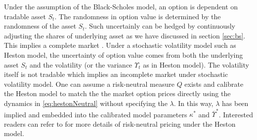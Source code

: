 \documentclass[letterpaper,12pt,titlepage,oneside,final]{book}
\numberwithin{equation}{section}
\theoremstyle{definition}
\begin{document}
Under the assumption of the Black-Scholes model, an option is dependent on tradable asset $S_t$. The randomness in option value is determined by the randomness of the asset $S_t$. Such uncertainly can be hedged by continuously adjusting the shares of underlying asset as we have discussed in  section \ref{sec:bs}. This implies a complete market \cite{shreve2004stochastic}.
Under a stochastic volatility model such as Heston model, the uncertainty of option value comes from both the underlying asset $S_t$ and the volatility (or the variance $\Upsilon_t$ as in Heston model). The volatility itself is not tradable which implies an incomplete market under stochastic volatility model. 
One can assume a risk-neutral measure $Q$ exists and calibrate the Heston model to match the the market option prices directly using the dynamics in \eqref{eq:hestonNeutral} without specifying the $\lambda$. In this way, $\lambda$ has been implied and embedded into the calibrated model parameters $\kappa^*$ and $\overline{\Upsilon}^*$. Interested readers can refer to \cite{heston1993closed,gatheral2011volatility} for more details of risk-neutral pricing under the Heston model.

\end{document}
